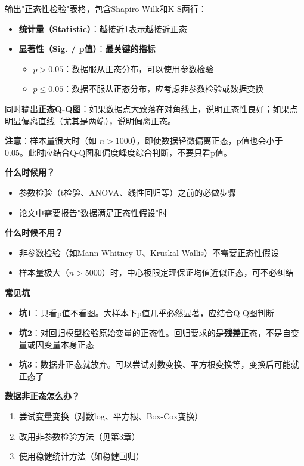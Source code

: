 \begin{algoresult}
输出"正态性检验"表格，包含Shapiro-Wilk和K-S两行：

\begin{itemize}
    \item \textbf{统计量（Statistic）}：越接近1表示越接近正态
    \item \textbf{显著性（Sig. / p值）}：\textbf{最关键的指标}
    \begin{itemize}
        \item $p > 0.05$：数据服从正态分布，可以使用参数检验
        \item $p \leq 0.05$：数据不服从正态分布，应考虑非参数检验或数据变换
    \end{itemize}
\end{itemize}

同时输出\textbf{正态Q-Q图}：如果数据点大致落在对角线上，说明正态性良好；如果点明显偏离直线（尤其是两端），说明偏离正态。

\textbf{注意}：样本量很大时（如 $n>1000$），即使数据轻微偏离正态，p值也会小于0.05。此时应结合Q-Q图和偏度峰度综合判断，不要只看p值。
\end{algoresult}

\begin{algonotes}
\textbf{什么时候用？}
\begin{itemize}
    \item 参数检验（t检验、ANOVA、线性回归等）之前的必做步骤
    \item 论文中需要报告"数据满足正态性假设"时
\end{itemize}

\textbf{什么时候不用？}
\begin{itemize}
    \item 非参数检验（如Mann-Whitney U、Kruskal-Wallis）不需要正态性假设
    \item 样本量极大（$n>5000$）时，中心极限定理保证均值近似正态，可不必纠结
\end{itemize}

\textbf{常见坑}
\begin{itemize}
    \item \textbf{坑1}：只看p值不看图。大样本下p值几乎必然显著，应结合Q-Q图判断
    \item \textbf{坑2}：对回归模型检验原始变量的正态性。回归要求的是\textbf{残差}正态，不是自变量或因变量本身正态
    \item \textbf{坑3}：数据非正态就放弃。可以尝试对数变换、平方根变换等，变换后可能就正态了
\end{itemize}

\textbf{数据非正态怎么办？}
\begin{enumerate}
    \item 尝试变量变换（对数log、平方根、Box-Cox变换）
    \item 改用非参数检验方法（见第3章）
    \item 使用稳健统计方法（如稳健回归）
\end{enumerate}
\end{algonotes}

